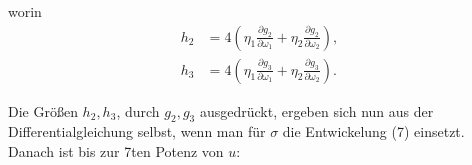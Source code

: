 
worin
\[
\begin{aligned}
h_2 &= 4\left(\eta_1\frac{\partial g_2}{\partial \omega_1} + \eta_2\frac{\partial g_2}{\partial \omega_2}\right), \\
h_3 &= 4\left(\eta_1\frac{\partial g_3}{\partial \omega_1} + \eta_2\frac{\partial g_3}{\partial \omega_2}\right).
\end{aligned}
\]

Die Größen $h_2, h_3$, durch $g_2, g_3$ ausgedrückt, ergeben sich nun
aus der Differentialgleichung selbst, wenn man für $\sigma$ die Entwickelung
 (7) einsetzt. Danach ist bis zur 7ten Potenz von $u$:
